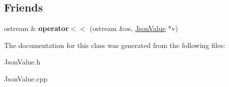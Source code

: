 \subsection*{Friends}
\begin{DoxyCompactItemize}
\item 
\hypertarget{class_json_value_ad653d7351669da553bc36ba709d5faa5}{ostream \& {\bfseries operator$<$$<$} (ostream \&os, \hyperlink{class_json_value}{Json\-Value} $\ast$v)}\label{class_json_value_ad653d7351669da553bc36ba709d5faa5}

\end{DoxyCompactItemize}


The documentation for this class was generated from the following files\-:\begin{DoxyCompactItemize}
\item 
Json\-Value.\-h\item 
Json\-Value.\-cpp\end{DoxyCompactItemize}
